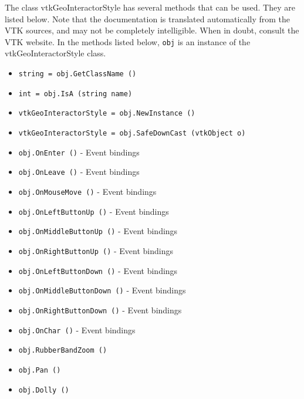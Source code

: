 The class vtkGeoInteractorStyle has several methods that can be used.
  They are listed below.
Note that the documentation is translated automatically from the VTK sources,
and may not be completely intelligible.  When in doubt, consult the VTK website.
In the methods listed below, \verb|obj| is an instance of the vtkGeoInteractorStyle class.
\begin{itemize}
\item  \verb|string = obj.GetClassName ()|

\item  \verb|int = obj.IsA (string name)|

\item  \verb|vtkGeoInteractorStyle = obj.NewInstance ()|

\item  \verb|vtkGeoInteractorStyle = obj.SafeDownCast (vtkObject o)|

\item  \verb|obj.OnEnter ()| -  Event bindings

\item  \verb|obj.OnLeave ()| -  Event bindings

\item  \verb|obj.OnMouseMove ()| -  Event bindings

\item  \verb|obj.OnLeftButtonUp ()| -  Event bindings

\item  \verb|obj.OnMiddleButtonUp ()| -  Event bindings

\item  \verb|obj.OnRightButtonUp ()| -  Event bindings

\item  \verb|obj.OnLeftButtonDown ()| -  Event bindings

\item  \verb|obj.OnMiddleButtonDown ()| -  Event bindings

\item  \verb|obj.OnRightButtonDown ()| -  Event bindings

\item  \verb|obj.OnChar ()| -  Event bindings

\item  \verb|obj.RubberBandZoom ()|

\item  \verb|obj.Pan ()|

\item  \verb|obj.Dolly ()|


\end{itemize}
